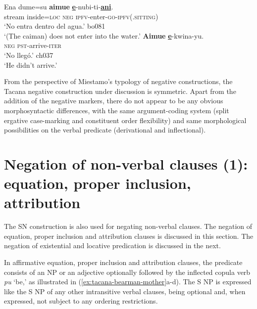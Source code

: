 \documentclass[output=paper]{langsci/langscibook}
\begin{document}
\begin{exe}\ex\label{ex:tacana-caiman-second}
\gll {\ob}Ena  dume=su{\cb}  \textbf{aimue}
\textbf{\underline{e}}-nubi-ti-\textbf{\underline{ani}}.\\
    stream  inside=\textsc{loc}  \textsc{neg}
    \textsc{ipfv}-enter-\textsc{go-ipfv(.sitting)}\\
\glt `No entra dentro del agua.' bo081\\
`(The caiman) does not enter into the water.'
\ex\label{ex:tacana-arrive} 
\gll \textbf{Aimue}  \textbf{\underline{e}}-kwina-yu.\\
 \textsc{neg}  \textsc{pst}-arrive-\textsc{iter}\\
\glt `No llegó.' ch037\\ 
`He didn't arrive.'
\end{exe}

From the perspective of Miestamo's \parencites*{Miestamo2005}{Miestamo2007} typology of negative constructions, the Tacana negative construction under discussion is symmetric. Apart from the addition of the negative markers, there do not appear to be any obvious morphosyntactic differences, with the same argument-coding system (split ergative case-marking and constituent order flexibility) and same morphological possibilities on the verbal predicate (derivational and inflectional). 

\section{Negation of non-verbal clauses (1): equation, proper inclusion, attribution}
\label{sec:tacana-4}

The SN construction is also used for negating non-verbal clauses. The
negation of equation, proper inclusion and attribution clauses is discussed
in this section. The negation of existential and locative predication is discussed in the next.

In affirmative equation, proper inclusion and attribution clauses, the
predicate consists of an NP or an adjective optionally followed by
the inflected copula verb \textit{pu} `be,' as illustrated in
(\ref{ex:tacana-bearman-mother}a-d). The S NP is expressed like the S NP of any other intransitive verbal clauses, being optional and, when expressed, not subject to any ordering restrictions.
\end{document}
